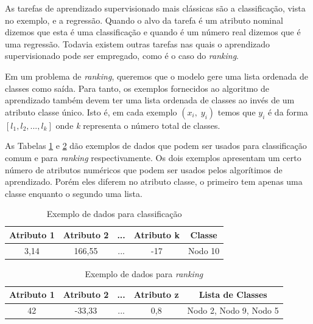 As tarefas de aprendizado supervisionado mais clássicas são a classificação, vista no exemplo, e a regressão.
Quando o alvo da tarefa é um atributo nominal dizemos que esta é uma classificação e quando é um número real dizemos que é uma regressão.
Todavia existem outras tarefas nas quais o aprendizado supervisionado pode ser empregado, como é o caso do \textit{ranking}.

Em um problema de \textit{ranking}, queremos que o modelo gere uma lista ordenada de classes como saída.
Para tanto, os exemplos fornecidos ao algoritmo de aprendizado também devem ter uma lista ordenada de classes ao invés de um atributo classe único.
Isto é, em cada exemplo $ (x_i,\; y_i) $ temos que $y_i$ é da forma $ [l_1, l_2, ..., l_k] $ onde \textit{k} representa o número total de classes.

As Tabelas \ref{tab:exdados1} e \ref{tab:exdados2} dão exemplos de dados que podem ser usados para classificação comum e para \textit{ranking} respectivamente.
Os dois exemplos apresentam um certo número de atributos numéricos que podem ser usados pelos algorítimos de aprendizado.
Porém eles diferem no atributo classe, o primeiro tem apenas uma classe enquanto o segundo uma lista.

\begin{table}[h!]
  \begin{center}
    \begin{tabular}{ccccc}
      \textbf{Atributo 1} & \textbf{Atributo 2} & ... & \textbf{Atributo k} & \textbf{Classe} \\
      \hline

      3,14 & 166,55 & ... & -17 & Nodo 10 \\

    \end{tabular}
    \caption{Exemplo de dados para classificação}
    \label{tab:exdados1}
  \end{center}
\end{table}

\begin{table}[h!]
  \begin{center}
    \begin{tabular}{ccccc}
      \textbf{Atributo 1} & \textbf{Atributo 2} & ... & \textbf{Atributo z} & \textbf{Lista de Classes} \\
      \hline

      42 & -33,33 & ... & 0,8 & Nodo 2, Nodo 9, Nodo 5 \\

    \end{tabular}
    \caption{Exemplo de dados para \textit{ranking}}
    \label{tab:exdados2}
  \end{center}
\end{table}

